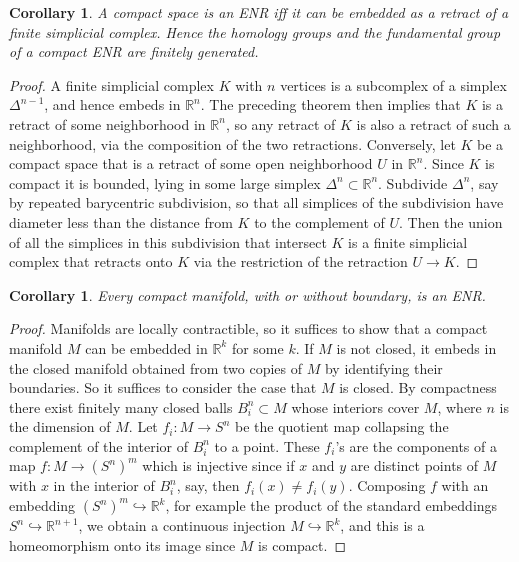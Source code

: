 \documentclass{article}
\newtheorem{corollary}[theorem]{Corollary}
\theoremstyle{definition}
\begin{document}
\begin{corollary}
A compact space is an ENR iff it can be embedded as a retract of a finite simplicial complex. Hence the homology groups and the fundamental group of a compact ENR are finitely generated.
\end{corollary}

\begin{proof}
A finite simplicial complex $K$ with $n$ vertices is a subcomplex of a simplex $\Delta^{n-1}$, and hence embeds in $\mathbb{R}^n$. The preceding theorem then implies that $K$ is a retract of some neighborhood in $\mathbb{R}^n$, so any retract of $K$ is also a retract of such a neighborhood, via the composition of the two retractions. Conversely, let $K$ be a compact space that is a retract of some open neighborhood $U$ in $\mathbb{R}^n$. Since $K$ is compact it is bounded, lying in some large simplex $\Delta^n \subset \mathbb{R}^n$. Subdivide $\Delta^n$, say by repeated barycentric subdivision, so that all simplices of the subdivision have diameter less than the distance from $K$ to the complement of $U$. Then the union of all the simplices in this subdivision that intersect $K$ is a finite simplicial complex that retracts onto $K$ via the restriction of the retraction $U \to K$.
\end{proof}

\begin{corollary}
Every compact manifold, with or without boundary, is an ENR.
\end{corollary}

\begin{proof}
Manifolds are locally contractible, so it suffices to show that a compact manifold $M$ can be embedded in $\mathbb{R}^k$ for some $k$. If $M$ is not closed, it embeds in the closed manifold obtained from two copies of $M$ by identifying their boundaries. So it suffices to consider the case that $M$ is closed. By compactness there exist finitely many closed balls $B_i^n \subset M$ whose interiors cover $M$, where $n$ is the dimension of $M$. Let $f_i: M \to S^n$ be the quotient map collapsing the complement of the interior of $B_i^n$ to a point. These $f_i$'s are the components of a map $f: M \to (S^n)^m$ which is injective since if $x$ and $y$ are distinct points of $M$ with $x$ in the interior of $B_i^n$, say, then $f_i(x) \neq f_i(y)$. Composing $f$ with an embedding $(S^n)^m \hookrightarrow \mathbb{R}^k$, for example the product of the standard embeddings $S^n \hookrightarrow \mathbb{R}^{n+1}$, we obtain a continuous injection $M \hookrightarrow \mathbb{R}^k$, and this is a homeomorphism onto its image since $M$ is compact.
\end{proof}
\end{document}
